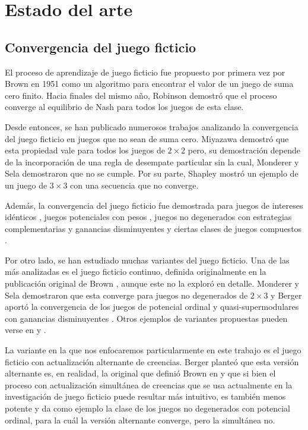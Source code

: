 \chapter{Estado del arte}  \label{cap:relwork}

\section{Convergencia del juego ficticio}

El proceso de aprendizaje de juego ficticio fue propuesto por primera vez por Brown en 1951 \cite{brown:1951} como un algoritmo para encontrar el valor de un juego de suma cero finito. Hacia finales del mismo año, Robinson \cite{robinson:zerosum} demostró que el proceso converge al equilibrio de Nash para todos los juegos de esta clase.

Desde entonces, se han publicado numerosos trabajos analizando la convergencia del juego ficticio en juegos que no sean de suma cero. Miyazawa \cite{miyazawa:2x2} demostró que esta propiedad vale para todos los juegos de $2 \times 2$ pero, su demostración depende de la incorporación de una regla de desempate particular sin la cual, Monderer y Sela \cite{2x2:without} demostraron que no se cumple. Por su parte, Shapley \cite{shapley:3x3} mostró un ejemplo de un juego de $3 \times 3$ con una secuencia que no converge.

Además, la convergencia del juego ficticio fue demostrada para juegos de intereses idénticos \cite{identical:interests}, juegos potenciales con pesos \cite{weighted:potential}, juegos no degenerados con estrategias complementarias y ganancias disminuyentes \cite{strategic:complementarities} y ciertas clases de juegos compuestos \cite{compound}.

Por otro lado, se han estudiado muchas variantes del juego ficticio. Una de las más analizadas es el juego ficticio continuo, definida originalmente en la publicación original de Brown \cite{brown:1951}, aunque este no la exploró en detalle. Monderer y Sela demostraron que esta converge para juegos no degenerados de $2 \times 3$ \cite{no:cycling} y Berger aportó la convergencia de los juegos de potencial ordinal y quasi-supermodulares con ganancias disminuyentes \cite{berger:two}. Otros ejemplos de variantes propuestas pueden verse en \cite{pattern:recog} y \cite{new:kind:fp}.

La variante en la que nos enfocaremos particularmente en este trabajo es el juego ficticio con actualización alternante de creencias. Berger \cite{browns:original} planteó que esta versión alternante es, en realidad, la original que definió Brown en \cite{brown:1951} y que si bien el proceso con actualización simultánea de creencias que se usa actualmente en la investigación de juego ficticio puede resultar más intuitivo, es también menos potente y da como ejemplo la clase de los juegos no degenerados con potencial ordinal, para la cuál la versión alternante converge, pero la simultánea no.

